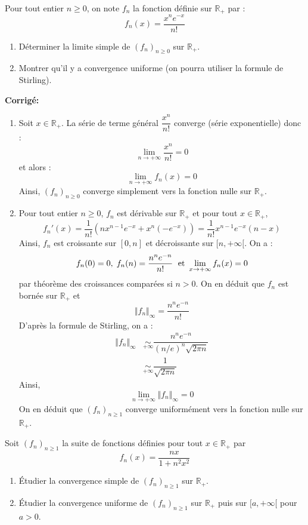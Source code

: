 \documentclass[a4paper,twoside,french,11pt]{VcCours}
\newcommand{\corr}{\textbf{Corrigé:}}
\begin{document}
\medskip

\begin{Exercice}{} Pour tout entier $n \geq 0$, on note $f_n$ la fonction définie sur $\mathbb{R}_+$ par :
$$ f_n(x) = \frac{x^n e^{-x}}{n!}$$

\begin{enumerate}
\item Déterminer la limite simple de $(f_n)_{n \geq 0}$ sur $\mathbb{R}_+$.
\item Montrer qu'il y a convergence uniforme (on pourra utiliser la formule de Stirling).
\end{enumerate}
\end{Exercice} 

\corr 

\begin{enumerate}
\item Soit $x \in \mathbb{R}_+$. La série de terme général $\dfrac{x^n}{n!}$ converge (série exponentielle) donc :
$$ \lim_{n \rightarrow + \infty}  \frac{x^n}{n!} = 0$$
et alors : 
$$ \lim_{n \rightarrow + \infty} f_n(x)=0$$
Ainsi, $(f_n)_{n \geq 0}$ converge simplement vers la fonction nulle sur $\mathbb{R}_+$.
\item Pour tout entier $n \geq 0$, $f_n$ est dérivable sur $\mathbb{R}_+$ et pour tout $x \in \mathbb{R}_+$,
$$ f_n'(x) = \dfrac{1}{n!} (nx^{n-1} e^{-x} + x^n (-e^{-x})) = \dfrac{1}{n!} x^{n-1} e^{-x} (n-x)$$
Ainsi, $f_n$ est croissante sur $[0,n]$ et décroissante sur $[n,+ \infty[$. On a :
$$ f_n(0)=0, \; f_n(n) = \dfrac{n^n e^{-n}}{n!} \; \hbox{ et } \lim_{x \rightarrow + \infty} f_n(x) = 0$$
par théorème des croissances comparées si $n>0$. On en déduit que $f_n$ est bornée sur $\mathbb{R}_+$ et 
$$ \Vert f_n \Vert_{\infty} = \dfrac{n^n e^{-n}}{n!}$$
D'après la formule de Stirling, on a :
\begin{align*}
 \Vert f_n \Vert_{\infty} & \underset{+ \infty}{\sim} \dfrac{n^n e^{-n}}{(n/e)^n \sqrt{2 \pi n}} \\
 & \underset{+ \infty}{\sim} \dfrac{1}{\sqrt{2 \pi n}} 
\end{align*}
Ainsi,
$$ \lim_{n \rightarrow + \infty} \Vert f_n \Vert_{\infty} = 0$$
On en déduit que $(f_n)_{n \geq 1}$ converge uniformément vers la fonction nulle sur $\mathbb{R}_+$.
\end{enumerate}

\medskip


\begin{Exercice}{} Soit $(f_n)_{n \geq 1}$ la suite de fonctions définies pour tout $x \in \mathbb{R}_+$ par 
$$f_n(x) = \frac {nx}{1+n^2x^2}$$
\begin{enumerate}
\item Étudier la convergence simple de $(f_n)_{n \geq 1}$ sur $\mathbb{R}_+$.
\item Étudier la convergence uniforme de $(f_n)_{n \geq 1}$ sur $\mathbb{R}_+$ puis sur $[a, + \infty[$ pour $a>0$.
\end{enumerate}
\end{Exercice}
\end{document}
